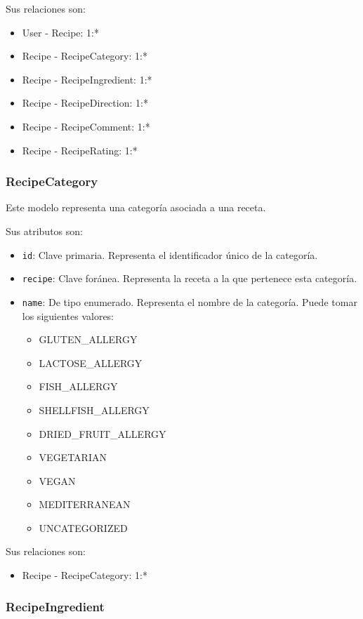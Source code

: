 Sus relaciones son:
\begin{itemize}
\item User - Recipe: 1:*
\item Recipe - RecipeCategory: 1:*
\item Recipe - RecipeIngredient: 1:*
\item Recipe - RecipeDirection: 1:*
\item Recipe - RecipeComment: 1:*
\item Recipe - RecipeRating: 1:*
\end{itemize}


\subsubsection{RecipeCategory}

Este modelo representa una categoría asociada a una receta.

Sus atributos son:
\begin{itemize}
\item \texttt{id}: Clave primaria. Representa el identificador único de la
  categoría.
\item \texttt{recipe}: Clave foránea. Representa la receta a la que pertenece
  esta categoría.
\item \texttt{name}: De tipo enumerado. Representa el nombre de la categoría.
  Puede tomar los siguientes valores:
  \begin{itemize}
  \item GLUTEN\_ALLERGY
  \item LACTOSE\_ALLERGY
  \item FISH\_ALLERGY
  \item SHELLFISH\_ALLERGY
  \item DRIED\_FRUIT\_ALLERGY
  \item VEGETARIAN
  \item VEGAN
  \item MEDITERRANEAN
  \item UNCATEGORIZED
  \end{itemize}
\end{itemize}

Sus relaciones son:
\begin{itemize}
\item Recipe - RecipeCategory: 1:*
\end{itemize}


\subsubsection{RecipeIngredient}

